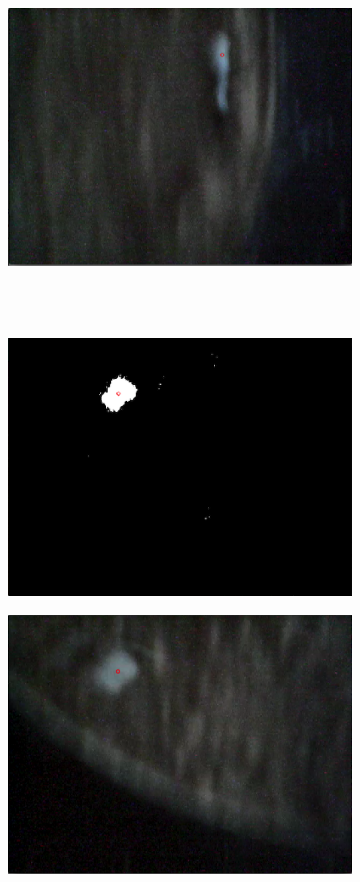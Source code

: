 \begin{figure}
\begin{subfigure}[b]{0.35\textwidth}
                \caption{}
        \end{subfigure}
		\quad
        \begin{subfigure}[b]{0.35\textwidth}
                \includegraphics[scale = 0.3]{img/good2}
                \caption{}
        \end{subfigure}\hfill \\ \mbox{}\\
        \begin{subfigure}[b]{0.35\textwidth}
                \includegraphics[scale = 0.3]{img/good3t}
                \caption{}
        \end{subfigure}
		\quad
        \begin{subfigure}[b]{0.35\textwidth}
                \includegraphics[scale = 0.3]{img/good3}

\end{subfigure}
\end{figure}
